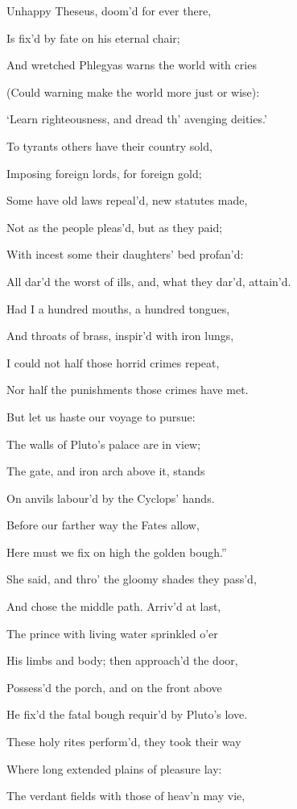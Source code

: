 Unhappy Theseus, doom’d for ever there,

Is fix’d by fate on his eternal chair;

And wretched Phlegyas warns the world with cries

(Could warning make the world more just or wise):

‘Learn righteousness, and dread th’ avenging deities.’

To tyrants others have their country sold,

Imposing foreign lords, for foreign gold;

Some have old laws repeal’d, new statutes made,

Not as the people pleas’d, but as they paid;

With incest some their daughters’ bed profan’d:

All dar’d the worst of ills, and, what they dar’d, attain’d.

Had I a hundred mouths, a hundred tongues,

And throats of brass, inspir’d with iron lungs,

I could not half those horrid crimes repeat,

Nor half the punishments those crimes have met.

But let us haste our voyage to pursue:

The walls of Pluto’s palace are in view;

The gate, and iron arch above it, stands

On anvils labour’d by the Cyclops’ hands.

Before our farther way the Fates allow,

Here must we fix on high the golden bough.”

She said, and thro’ the gloomy shades they pass’d,

And chose the middle path. Arriv’d at last,

The prince with living water sprinkled o’er

His limbs and body; then approach’d the door,

Possess’d the porch, and on the front above

He fix’d the fatal bough requir’d by Pluto’s love.

These holy rites perform’d, they took their way

Where long extended plains of pleasure lay:

The verdant fields with those of heav’n may vie,

